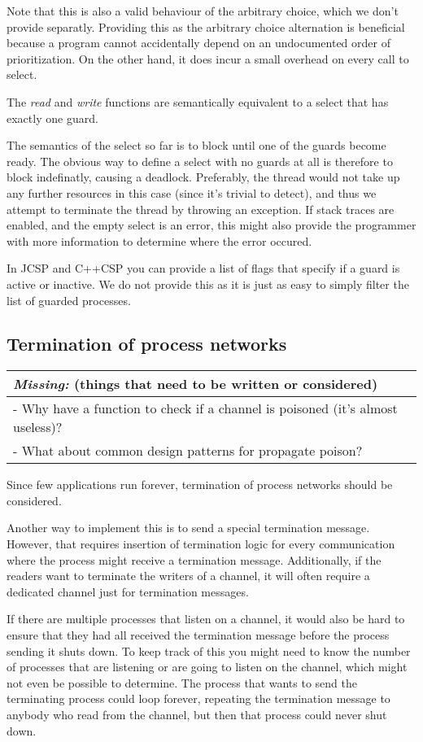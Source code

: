 \documentclass[a4paper,12pt]{article}
\newcommand{\missing}[1]{
  \begin{tabular}{|p{11cm}|}
    \hline
    \emph{Missing:} {\scriptsize (things that need to be written or considered)} \\
    \hline
    #1
    \hline
  \end{tabular}
}
\begin{document}
Note that this is also a valid behaviour of the arbitrary choice, which we don't
provide separatly. Providing this as the arbitrary choice alternation is
beneficial because a program cannot accidentally depend on an undocumented
order of prioritization. On the other hand, it does incur a small overhead on
every call to select.

The \emph{read} and \emph{write} functions are semantically equivalent to a select that has exactly 
one guard.

The semantics of the select so far is to block until one of the guards become ready. The obvious
way to define a select with no guards at all is therefore to block indefinatly, causing a deadlock.
Preferably, the thread would not take up any further resources in this case (since it's trivial to 
detect), and thus we attempt to terminate the thread by throwing an exception. If stack traces are
enabled, and the empty select is an error, this might also provide the programmer with more information
to determine where the error occured.

In JCSP and C++CSP you can provide a list of flags that specify if a guard is
active or inactive. We do not provide this as it is just as easy to simply
filter the list of guarded processes.

\subsection{Termination of process networks}
\missing{
- Why have a function to check if a channel is poisoned (it's almost useless)?\\
- What about common design patterns for propagate poison?\\
}

Since few applications run forever, termination of process networks should be
considered.

Another way to implement this is to send a special termination message. However,
that requires insertion of termination logic for every communication where the
process might receive a termination message. Additionally, if the readers want
to terminate the writers of a channel, it will often require a dedicated channel
just for termination messages.

If there are multiple processes that listen on a channel, it would also be hard
to ensure that they had all received the termination message before the process
sending it shuts down. To keep track of this you might need to know the number
of processes that are listening or are going to listen on the channel, which
might not even be possible to determine. The process that wants to send the
terminating process could loop forever, repeating the termination message to
anybody who read from the channel, but then that process could never shut down.
\end{document}
